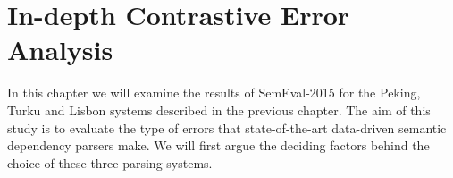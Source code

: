 \chapter{In-depth Contrastive Error Analysis}
\label{chap:analysis}




In this chapter we will examine the results of SemEval-2015 for the Peking, Turku and Lisbon systems described in the previous chapter. The aim of this study is to evaluate the type of errors that state-of-the-art data-driven semantic dependency parsers make. We will first argue the deciding factors behind the choice of these three parsing systems. 

